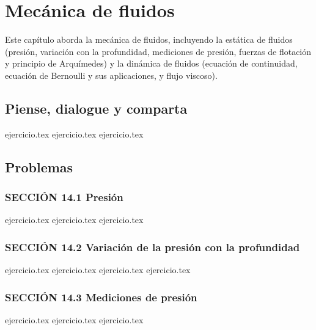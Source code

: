 \chapter{Mecánica de fluidos}
\label{cap:mecanica_de_fluidos}

Este capítulo aborda la mecánica de fluidos, incluyendo la estática de fluidos (presión, variación con la profundidad, mediciones de presión, fuerzas de flotación y principio de Arquímedes) y la dinámica de fluidos (ecuación de continuidad, ecuación de Bernoulli y sus aplicaciones, y flujo viscoso).

\section*{Piense, dialogue y comparta}
\begin{enumerate}
    {ejercicio.tex}
    {ejercicio.tex}
    {ejercicio.tex}
\end{enumerate}

\section*{Problemas}

\subsection*{SECCIÓN 14.1 Presión}
\begin{enumerate}
    {ejercicio.tex}
    {ejercicio.tex}
    {ejercicio.tex}
\end{enumerate}

\subsection*{SECCIÓN 14.2 Variación de la presión con la profundidad}
\begin{enumerate}
    \setcounter{enumi}{3}
    {ejercicio.tex}
    {ejercicio.tex}
    {ejercicio.tex}
    {ejercicio.tex}
\end{enumerate}

\subsection*{SECCIÓN 14.3 Mediciones de presión}
\begin{enumerate}
    \setcounter{enumi}{7}
    {ejercicio.tex}
    {ejercicio.tex}
    {ejercicio.tex}
\end{enumerate}


